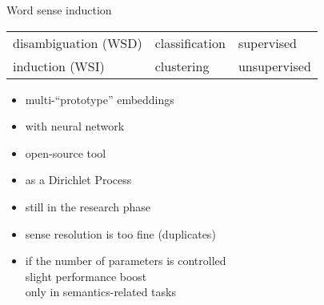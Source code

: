 \documentclass[10pt]{beamer}%
\begin{document}
\begin{frame}{Word sense induction}
  \begin{tabular} {lll}
    \toprule
    disambiguation (WSD) & classification & supervised \\
    induction (WSI) \citep{Schutze:1998} & clustering & unsupervised \\
    \bottomrule
  \end{tabular}
    \begin{itemize}
      \item multi-``prototype'' embeddings \citep{Reisinger:2010}
      \item with neural network \citep{Huang:2012}
      \item open-source tool \citep{Neelakantan:2014}
      \item as a Dirichlet Process \cite{Li:2015,Bartunov:2015}
      \item still in the research phase
      \item sense resolution is too fine (duplicates)
      \item if the number of parameters is controlled \\
        slight performance boost \\
            only in semantics-related tasks \citep{Li:2015}
    \end{itemize}
\end{frame}

\end{document}
